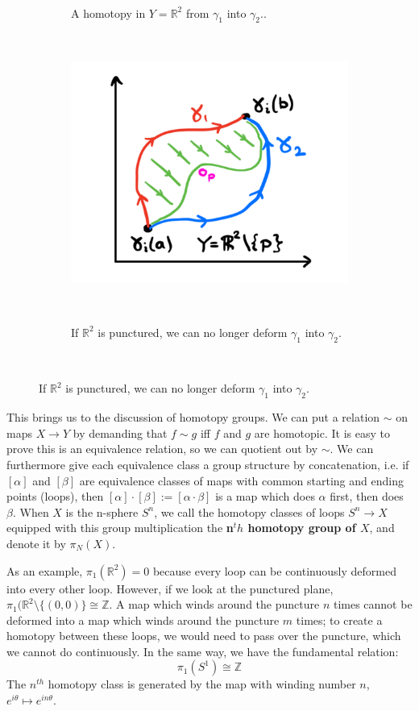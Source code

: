 \documentclass[11pt, oneside]{article}   	%
\theoremstyle{definition}
\newenvironment{answer}{\begin{center}\begin{answerbox}}{\end{answerbox}\end{center}}
\begin{document}
\begin{answer}
\begin{figure}[H]
\begin{subfigure}[t]{.4\textwidth}
		\caption{A homotopy in $Y = \mathbb R^2$ from $\gamma_1$ into $\gamma_2$..}~
		\label{subfig:homotopy1}
	\end{subfigure}
	~
	\begin{subfigure}[t]{.4\textwidth}
		\centering
		\includegraphics[width = .8\textwidth]{homotopy_2}
		\caption{If $\mathbb R^2$ is punctured, we can no longer deform $\gamma_1$ into $\gamma_2$. }~
		\label{subfig:homotopy2}
	\end{subfigure}~
	\label{fig:homotopy}
	\end{figure}
	\begin{flushleft} \setlength{\parindent}{2em}
	This brings us to the discussion of homotopy groups. We can put a relation $\sim$ on maps $X\rightarrow Y$ by demanding 
	that $f\sim g$ iff $f$ and $g$ are homotopic. It is easy to prove this is an equivalence relation, so we can quotient out by $\sim$. 
	We can furthermore give each equivalence class a group structure by concatenation, i.e. if $[\alpha]$ and $[\beta]$ are 
	equivalence classes of maps with common starting and ending points (loops), then $[\alpha]\cdot[\beta] := [\alpha\cdot\beta]$ is a map which 
	does $\alpha$ first, then does $\beta$. When $X$ is the n-sphere $S^n$, we call the homotopy classes of loops $S^n\rightarrow X$ equipped 
	with this group multiplication the \textbf{n$^th$ homotopy group of $X$}, and denote it by $\pi_N(X)$. 
	
	As an example, $\pi_1(\mathbb R^2) = 0$ because every loop can be continuously deformed into every other loop. However, if we look 
	at the punctured plane, $\pi_1(\mathbb R^2\setminus \{(0, 0)\}\cong\mathbb Z$. A map which winds around the puncture $n$ times cannot 
	be deformed into a map which winds around the puncture $m$ times; to create a homotopy between these loops, we would need to 
	pass over the puncture, which we cannot do continuously. In the same way, we have the fundamental relation:
	\begin{equation}
		\pi_1(S^1)\cong\mathbb Z
	\end{equation}
	The $n^{th}$ homotopy class is generated by the map with winding number $n$, $e^{i\theta}\mapsto e^{in\theta}$. 
	\end{flushleft}
\end{answer}
\end{document}
